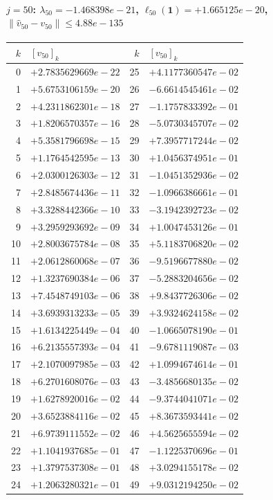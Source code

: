 \documentclass[11pt]{article}
\begin{document}
\paragraph{$j = 50$: $\lambda_{50} = -1.468398e-21$, \quad $\ell_{50}(\mathbf{1}) = +1.665125e-20$, \quad $\|\hat v_{50} - v_{50}\| \leq 4.88e-135$}
\begin{center}
{\footnotesize
\begin{tabular}{r@{\;\;}l@{\quad}r@{\;\;}l}
\toprule
$k$ & $[v_{50}]_k$ & $k$ & $[v_{50}]_k$ \\
\midrule
0 & $+2.7835629669e-22$ & 25 & $+4.1177360547e-02$ \\
1 & $+5.6753106159e-20$ & 26 & $-6.6614545461e-02$ \\
2 & $+4.2311862301e-18$ & 27 & $-1.1757833392e-01$ \\
3 & $+1.8206570357e-16$ & 28 & $-5.0730345707e-02$ \\
4 & $+5.3581796698e-15$ & 29 & $+7.3957717244e-02$ \\
5 & $+1.1764542595e-13$ & 30 & $+1.0456374951e-01$ \\
6 & $+2.0300126303e-12$ & 31 & $-1.0451352936e-02$ \\
7 & $+2.8485674436e-11$ & 32 & $-1.0966386661e-01$ \\
8 & $+3.3288442366e-10$ & 33 & $-3.1942392723e-02$ \\
9 & $+3.2959293692e-09$ & 34 & $+1.0047453126e-01$ \\
10 & $+2.8003675784e-08$ & 35 & $+5.1183706820e-02$ \\
11 & $+2.0612860068e-07$ & 36 & $-9.5196677880e-02$ \\
12 & $+1.3237690384e-06$ & 37 & $-5.2883204656e-02$ \\
13 & $+7.4548749103e-06$ & 38 & $+9.8437726306e-02$ \\
14 & $+3.6939313233e-05$ & 39 & $+3.9324624158e-02$ \\
15 & $+1.6134225449e-04$ & 40 & $-1.0665078190e-01$ \\
16 & $+6.2135557393e-04$ & 41 & $-9.6781119087e-03$ \\
17 & $+2.1070097985e-03$ & 42 & $+1.0994674614e-01$ \\
18 & $+6.2701608076e-03$ & 43 & $-3.4856680135e-02$ \\
19 & $+1.6278920016e-02$ & 44 & $-9.3744041071e-02$ \\
20 & $+3.6523884116e-02$ & 45 & $+8.3673593441e-02$ \\
21 & $+6.9739111552e-02$ & 46 & $+4.5625655594e-02$ \\
22 & $+1.1041937685e-01$ & 47 & $-1.1225370696e-01$ \\
23 & $+1.3797537308e-01$ & 48 & $+3.0294155178e-02$ \\
24 & $+1.2063280321e-01$ & 49 & $+9.0312194250e-02$ \\
\bottomrule
\end{tabular}
}
\end{center}
\end{document}
